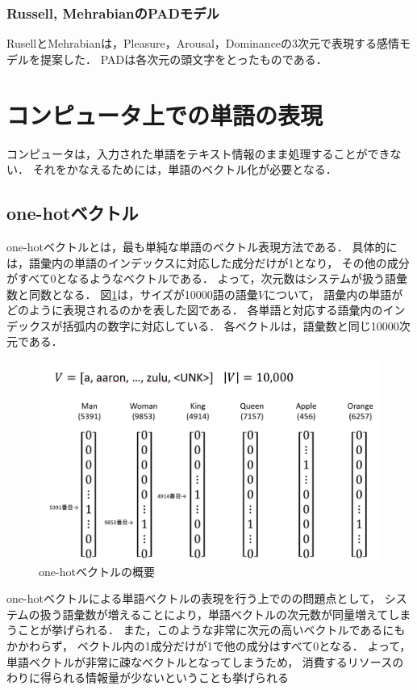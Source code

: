 		\subsubsection{Russell, MehrabianのPADモデル}
			RusellとMehrabian\cite{russell_3D}は，Pleasure，Arousal，Dominanceの3次元で表現する感情モデルを提案した．
			PADは各次元の頭文字をとったものである．

\section{コンピュータ上での単語の表現}
	コンピュータは，入力された単語をテキスト情報のまま処理することができない．
	それをかなえるためには，単語のベクトル化が必要となる．

	\subsection{one-hotベクトル}
		one-hotベクトルとは，最も単純な単語のベクトル表現方法である．
		具体的には，語彙内の単語のインデックスに対応した成分だけが1となり，
		その他の成分がすべて0となるようなベクトルである．
		よって，次元数はシステムが扱う語彙数と同数となる．
		図\ref{fig:one-hot-vector}は，サイズが10000語の語彙$V$について，
		語彙内の単語がどのように表現されるのかを表した図である．
		各単語と対応する語彙内のインデックスが括弧内の数字に対応している．
		各ベクトルは，語彙数と同じ10000次元である．
		\begin{figure}[H]
			\centering
			\includegraphics[width=\linewidth]{./figure/one-hot-vector.png}
			\caption{one-hotベクトルの概要}
			\label{fig:one-hot-vector}
		\end{figure}

		one-hotベクトルによる単語ベクトルの表現を行う上でのの問題点として，
		システムの扱う語彙数が増えることにより，単語ベクトルの次元数が同量増えてしまうことが挙げられる．
		また，このような非常に次元の高いベクトルであるにもかかわらず，
		ベクトル内の1成分だけが1で他の成分はすべて0となる．
		よって，単語ベクトルが非常に疎なベクトルとなってしまうため，
		消費するリソースのわりに得られる情報量が少ないということも挙げられる

